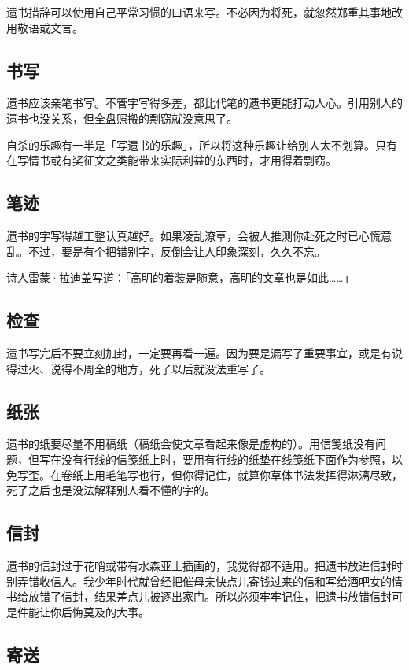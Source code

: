 \documentclass[UTF8]{ctexart}
\begin{document}
遗书措辞可以使用自己平常习惯的口语来写。不必因为将死，就忽然郑重其事地改用敬语或文言。

\subsection{书写}

遗书应该亲笔书写。不管字写得多差，都比代笔的遗书更能打动人心。引用别人的遗书也没关系，但全盘照搬的剽窃就没意思了。

自杀的乐趣有一半是「写遗书的乐趣」，所以将这种乐趣让给别人太不划算。只有在写情书或有奖征文之类能带来实际利益的东西时，才用得着剽窃。

\subsection{笔迹}

遗书的字写得越工整认真越好。如果凌乱潦草，会被人推测你赴死之时已心慌意乱。不过，要是有个把错别字，反倒会让人印象深刻，久久不忘。

诗人雷蒙·拉迪盖写道：「高明的着装是随意，高明的文章也是如此……」

\subsection{检查}

遗书写完后不要立刻加封，一定要再看一遍。因为要是漏写了重要事宜，或是有说得过火、说得不周全的地方，死了以后就没法重写了。

\subsection{纸张}

遗书的纸要尽量不用稿纸（稿纸会使文章看起来像是虚构的）。用信笺纸没有问题，但写在没有行线的信笺纸上时，要用有行线的纸垫在线笺纸下面作为参照，以免写歪。在卷纸上用毛笔写也行，但你得记住，就算你草体书法发挥得淋漓尽致，死了之后也是没法解释别人看不懂的字的。

\subsection{信封}

遗书的信封过于花哨或带有水森亚土插画的，我觉得都不适用。把遗书放进信封时别弄错收信人。我少年时代就曾经把催母亲快点儿寄钱过来的信和写给酒吧女的情书给放错了信封，结果差点儿被逐出家门。所以必须牢牢记住，把遗书放错信封可是件能让你后悔莫及的大事。

\subsection{寄送}
\end{document}
